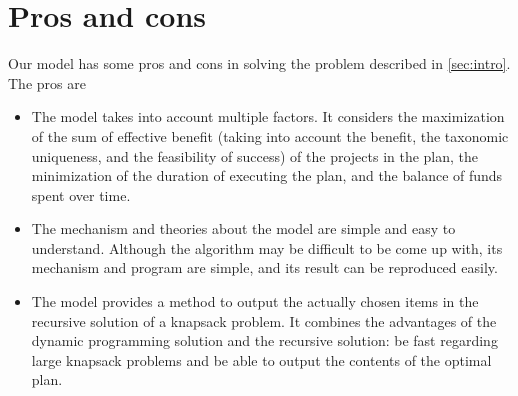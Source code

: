 \documentclass{article}
\begin{document}

\section{Pros and cons}
Our model has some pros and cons in solving the problem described in \ref{sec:intro}.
The pros are
\begin{itemize}
\item The model takes into account multiple factors.
It considers the maximization of the sum of effective benefit
(taking into account the benefit, the taxonomic uniqueness, and the feasibility of success)
of the projects in the plan,
the minimization of the duration of executing the plan,
and the balance of funds spent over time.
\item The mechanism and theories about the model are simple and easy to understand.
Although the algorithm may be difficult to be come up with,
its mechanism and program are simple, and its result can be reproduced easily.
\item The model provides a method to output the actually chosen items in the recursive solution of a knapsack problem.
It combines the advantages of the dynamic programming solution and the recursive solution: be fast regarding large knapsack problems and be able to output the contents of the optimal plan.
\end{itemize}
\end{document}
